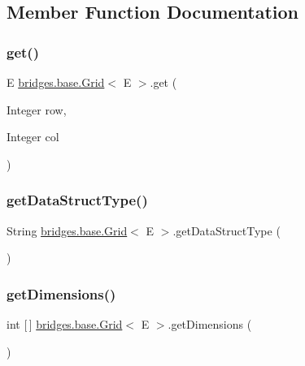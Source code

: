\subsection{Member Function Documentation}
\mbox{\label{classbridges_1_1base_1_1_grid_a698579bb5b7166f76a18a1b04916e090}} 
\subsubsection{\texorpdfstring{get()}{get()}}
{\footnotesize\ttfamily E \mbox{\hyperlink{classbridges_1_1base_1_1_grid}{bridges.\+base.\+Grid}}$<$ E $>$.get (\begin{DoxyParamCaption}\item[{Integer}]{row,  }\item[{Integer}]{col }\end{DoxyParamCaption})}

\mbox{\label{classbridges_1_1base_1_1_grid_a81f268dd27c292ff2af9358039d4ebe6}} 
\subsubsection{\texorpdfstring{get\+Data\+Struct\+Type()}{getDataStructType()}}
{\footnotesize\ttfamily String \mbox{\hyperlink{classbridges_1_1base_1_1_grid}{bridges.\+base.\+Grid}}$<$ E $>$.get\+Data\+Struct\+Type (\begin{DoxyParamCaption}{ }\end{DoxyParamCaption})}

\mbox{\label{classbridges_1_1base_1_1_grid_aee8a5b66095d65ff067a4e76f2611b0e}} 
\subsubsection{\texorpdfstring{get\+Dimensions()}{getDimensions()}}
{\footnotesize\ttfamily int \mbox{[}$\,$\mbox{]} \mbox{\hyperlink{classbridges_1_1base_1_1_grid}{bridges.\+base.\+Grid}}$<$ E $>$.get\+Dimensions (\begin{DoxyParamCaption}{ }\end{DoxyParamCaption})}

